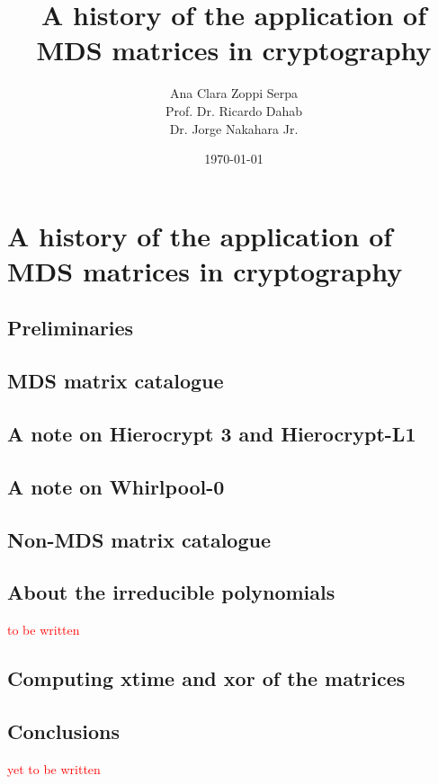 \documentclass{report}
\title{A history of the application of MDS matrices in cryptography}
\author{Ana Clara Zoppi Serpa\\ Prof. Dr. Ricardo Dahab \\ Dr. Jorge Nakahara Jr.}
\date{\today}
\begin{document}

\maketitle

\tableofcontents

\chapter{A history of the application of MDS matrices in cryptography}


\section{Preliminaries}


\section{MDS matrix catalogue}




\section{A note on Hierocrypt 3 and Hierocrypt-L1}


\section{A note on Whirlpool-0}\label{sec:whirlpool}


\section{Non-MDS matrix catalogue}\label{sec:non-mds}


\section{About the irreducible polynomials}
\textcolor{red}{to be written}
%

\section{Computing \textbf{xtime} and \textbf{xor} of the matrices}



\section{Conclusions}
\textcolor{red}{yet to be written}



\end{document}
